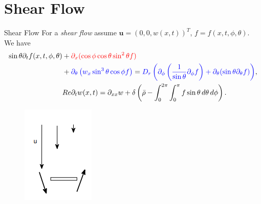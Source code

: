 \section{Shear Flow}
\begin{frame}{Shear Flow}
	\scriptsize
	For a \textit{shear flow} assume $	\boldsymbol{u} = (0,0,w(x,t))^T$, $f=f(x,t,\phi,\theta)$. \\
	\vspace{5mm}
 We have
\begin{equation}
	\begin{aligned}
		\sin\theta \partial_{t}f(x,t,\phi,\theta) & + \textcolor{red}{\partial_x (\cos\phi \cos\theta \sin^2\theta f)} \\
		& + \textcolor{blue}{\partial_\theta \left(w_x \sin^3 \theta \cos \phi f\right)}
		= \textcolor{blue}{D_{r} \left( \partial_\phi \left(\frac{1}{\sin \theta} \partial_\phi f \right) + \partial_\theta (\sin \theta \partial_\theta f) \right)}, \\
		& Re \partial_{t}w(x,t) = \partial_{xx}w + \delta \left( \bar{\rho} - \int_{0}^{2\pi} \int_{0}^{\pi} f \sin \theta \, d\theta \, d\phi \right). \label{SmochEq_wx}
	\end{aligned}
\end{equation}
\begin{figure}[H]
    \flushleft
	\includegraphics[scale=0.5]{Bilder/Ausrichtung_Partikeln}
\end{figure}
\end{frame}









